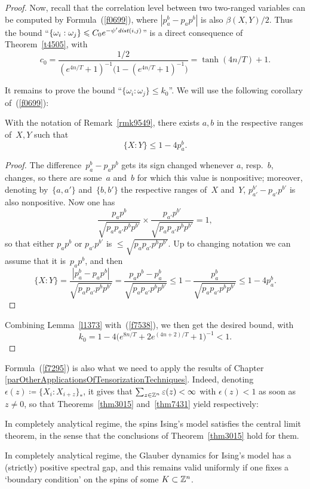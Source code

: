 \begin{proof}
Now, recall that the correlation level between two two-ranged variables
can be computed by Formula~(\ref{f0699}), where
$|p_a^b-p_ap^b|$ is also $\beta(X,Y)/2$.
Thus the bound ``$\{\omega_i:\omega_j\} \leqslant C_0 e^{-\psi' \mathit{dist}(i,j)}$''
is a direct consequence of Theorem~\ref{t4505}, with
\[ c_0 = \frac{1/2}{(e^{4n/T}+1)^{-1}\big(1-(e^{4n/T} + 1)^{-1}\big)}
= \tanh(4n/T) + 1 .\]

It remains to prove the bound ``$\{\omega_i:\omega_j\} \leq k_0$''.
We will use the following corollary of~(\ref{f0699}):
%
\begin{Lem}\label{l1373}
With the notation of Remark~\ref{rmk9549},
there exists $a,b$ in the respective ranges of~$X,Y$ such that
\[ \{X:Y\} \leq 1 - 4p_a^b .\]
\end{Lem}

\begingroup{}%
\begin{proof}
The difference~$p_a^b-p_ap^b$ gets its sign changed whenever $a$, resp.~$b$, changes,
so there are some~$a$ and~$b$ for which this value is nonpositive;
moreover, denoting by~$\{a,a'\}$ and~$\{b,b'\}$ the respective ranges of~$X$ and~$Y$,
$p_{a'}^{b'}-p_{a'}p^{b'}$ is also nonpositive.
Now one has
\[ \frac{p_ap^b}{\sqrt{p_ap_{a'}p^bp^{b'}}} \times \frac{p_{a'}p^{b'}}{\sqrt{p_ap_{a'}p^bp^{b'}}}
= 1 ,\]
so that either $p_ap^b$ or $p_{a'}p^{b'}$ is $\leq \sqrt{p_ap_{a'}p^bp^{b'}}$.
Up to changing notation we can assume that it is~$p_ap^b$,
and then
\[ \{X:Y\} = \frac{|p_a^b-p_ap^b|}{\sqrt{p_ap_{a'}p^bp^{b'}}}
= \frac{p_ap^b - p_a^b}{\sqrt{p_ap_{a'}p^bp^{b'}}}
\leq 1 - \frac{p_a^b}{\sqrt{p_ap_{a'}p^bp^{b'}}} \leq 1 - 4p_a^b .\]
\end{proof}\endgroup

Combining Lemma~\ref{l1373} with~(\ref{f7538}),
we then get the desired bound, with
\[ k_0 = 1 - 4\big( e^{8n/T} + 2e^{(4n+2)/T} + 1 \big)^{-1} < 1 .\]
\end{proof}\endgroup


Formula~(\ref{f7295}) is also what we need to apply the results of Chapter~%
\ref{parOtherApplicationsOfTensorizationTechniques}. Indeed, denoting
$\epsilon(z) \coloneqq \{ X_i : X_{i+z} \}_*$, it gives that $\sum_{z\in\mathbb{Z}^n} \varepsilon(z) < \infty$
with $\epsilon(z) < 1$ as soon as $z \neq 0$,
so that Theorems~\ref{thm3015} and~\ref{thm7431} yield respectively:
%
\begin{Thm}
In completely analytical regime, the spins Ising's model satisfies
the central limit theorem, in the sense that the conclusions of Theorem~\ref{thm3015}
hold for them.
\end{Thm}
%
\begin{Thm}
In completely analytical regime, the Glauber dynamics for Ising's model
has a (strictly) positive spectral gap,
and this remains valid uniformly if one fixes
a `boundary condition' on the spins of some $K \subset \mathbb{Z}^n$.
\end{Thm}

